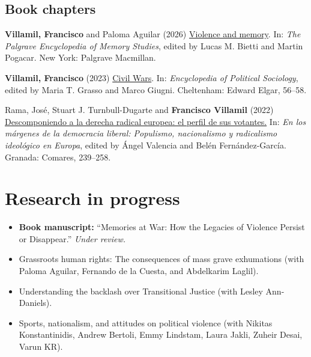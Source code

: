 \documentclass[a4paper, 12pt]{article}
\begin{document}
\subsection*{Book chapters}

\begin{etaremune}[leftmargin=12pt, itemsep=0pt]
\item \textbf{Villamil, Francisco} and Paloma Aguilar (2026) \href{https://doi.org/10.1007/978-3-030-93789-8_49-1}{Violence and memory}. In: \textit{The Palgrave Encyclopedia of Memory Studies}, edited by Lucas M. Bietti and Martin Pogacar. New York: Palgrave Macmillan. %
\item \textbf{Villamil, Francisco} (2023) \href{https://doi.org/10.4337/9781803921235.00020}{Civil Wars}. In: \textit{Encyclopedia of Political Sociology}, edited by Maria T. Grasso and Marco Giugni. Cheltenham: Edward Elgar, 56--58. %
\item Rama, José, Stuart J. Turnbull-Dugarte and \textbf{Francisco Villamil} (2022) \href{https://www.comares.com/libro/en-los-margenes-de-la-democracia-liberal_143816/}{Descomponiendo a la derecha radical europea: el perfil de sus votantes.} In: \textit{En los márgenes de la democracia liberal: Populismo, nacionalismo y radicalismo ideológico en Europa}, edited by Ángel Valencia and Belén Fernández-García. Granada: Comares, 239--258. %
\end{etaremune}

\section*{Research in progress}

\begin{itemize}[leftmargin=*, nolistsep]
\item \textbf{Book manuscript:} ``Memories at War: How the Legacies of Violence Persist or Disappear.'' \textit{Under review.}
\item Grassroots human rights: The consequences of mass grave exhumations (with Paloma Aguilar, Fernando de la Cuesta, and Abdelkarim Laglil).
\item Understanding the backlash over Transitional Justice (with Lesley Ann-Daniels).
\item Sports, nationalism, and attitudes on political violence (with Nikitas Konstantinidis, Andrew Bertoli, Emmy Lindstam, Laura Jakli, Zuheir Desai, Varun KR).
\end{itemize}
\end{document}
